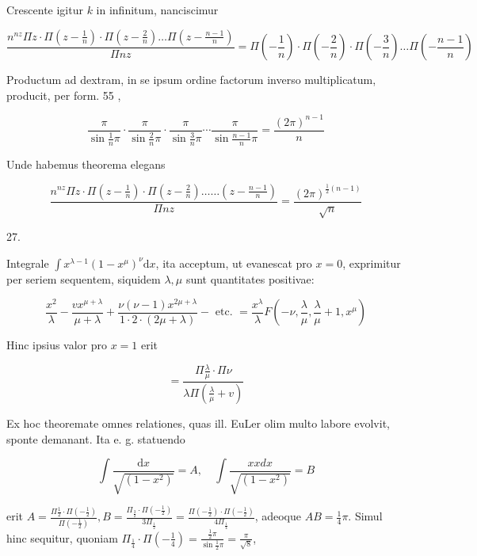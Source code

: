 \documentclass[10pt]{article}
\begin{document}
Crescente igitur \(k\) in infinitum, nanciscimur

\[
\frac{n^{n z} \Pi z \cdot \Pi\left(z-\frac{1}{n}\right) \cdot \Pi\left(z-\frac{2}{n}\right) \ldots \Pi\left(z-\frac{n-1}{n}\right)}{\Pi n z}=\Pi\left(-\frac{1}{n}\right) \cdot \Pi\left(-\frac{2}{n}\right) \cdot \Pi\left(-\frac{3}{n}\right) \ldots \Pi\left(-\frac{n-1}{n}\right)
\]

Productum ad dextram, in se ipsum ordine factorum inverso multiplicatum, producit, per form. 55 ,

\[
\frac{\pi}{\sin \frac{1}{n} \pi} \cdot \frac{\pi}{\sin \frac{2}{n} \pi} \cdot \frac{\pi}{\sin \frac{3}{n} \pi} \cdots \frac{\pi}{\sin \frac{n-1}{n} \pi}=\frac{(2 \pi)^{n-1}}{n}
\]

Unde habemus theorema elegans

\[
\frac{n^{n z} \Pi z \cdot \Pi\left(z-\frac{1}{n}\right) \cdot \Pi\left(z-\frac{2}{n}\right) \ldots \ldots\left(z-\frac{n-1}{n}\right)}{\Pi n z}=\frac{(2 \pi)^{\frac{1}{2}(n-1)}}{\sqrt{n}}
\]

27.

Integrale \(\int x^{\lambda-1}\left(1-x^{\mu}\right)^{\nu} \mathrm{d} x\), ita acceptum, ut evanescat pro \(x=0\), exprimitur per seriem sequentem, siquidem \(\lambda, \mu\) sunt quantitates positivae:

\[
\frac{x^{2}}{\lambda}-\frac{v x^{\mu+\lambda}}{\mu+\lambda}+\frac{\nu(\nu-1) x^{2 \mu+\lambda}}{1 \cdot 2 \cdot(2 \mu+\lambda)}-\text { etc. }=\frac{x^{\lambda}}{\lambda} F\left(-\nu, \frac{\lambda}{\mu}, \frac{\lambda}{\mu}+1, x^{\mu}\right)
\]

Hinc ipsius valor pro \(x=1\) erit

\[
=\frac{\Pi \frac{\lambda}{\mu} \cdot \Pi \nu}{\lambda \Pi\left(\frac{\lambda}{\mu}+v\right)}
\]

Ex hoc theoremate omnes relationes, quas ill. EuLer olim multo labore evolvit, sponte demanant. Ita e. g. statuendo

\[
\int \frac{\mathrm{d} x}{\sqrt{\left(1-x^{2}\right)}}=A, \quad \int \frac{x x d x}{\sqrt{\left(1-x^{2}\right)}}=B
\]

erit \(A=\frac{\Pi \frac{1}{2} \cdot \Pi\left(-\frac{1}{2}\right)}{\Pi\left(-\frac{1}{2}\right)}, B=\frac{\Pi_{\frac{3}{2}} \cdot \Pi\left(-\frac{1}{2}\right)}{3 \Pi_{\frac{1}{2}}}=\frac{\Pi\left(-\frac{1}{2}\right) \cdot \Pi\left(-\frac{1}{2}\right)}{4 \Pi_{\frac{1}{4}}}\), adeoque \(A B=\frac{1}{4} \pi\). Simul hinc sequitur, quoniam \(\Pi_{\frac{1}{4}} \cdot \Pi\left(-\frac{1}{4}\right)=\frac{\frac{1}{2} \pi}{\sin \frac{1}{2} \pi}=\frac{\pi}{\sqrt{8}}\),
\end{document}
